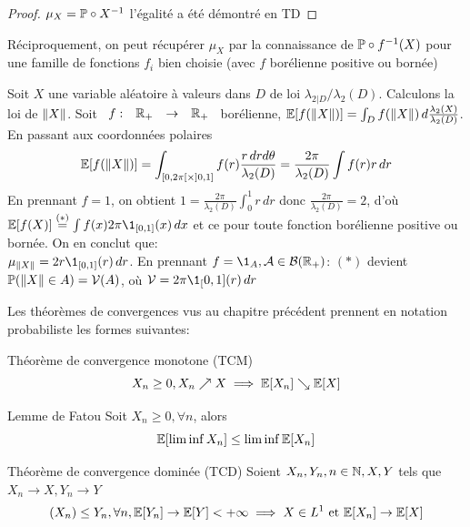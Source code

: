 \documentclass[]{report}
\begin{document}
    \begin{proof}
        $\mu_X=\mathbb{P}\circ X^{-1}$ l'égalité a été démontré en TD
    \end{proof}

    \begin{re}{}{}
        Réciproquement, on peut récupérer $\mu_X$ par la connaissance de $\mathbb{P}\circ f^{-1}(X)$ pour une famille de fonctions $f_i$ bien choisie (avec $f$ borélienne positive ou bornée)
    \end{re}

    \begin{ex}{}{}
        Soit $X$ une variable aléatoire à valeurs dans $D$ de loi $\lambda_{2|D}/\lambda_2(D)$. Calculons la loi de $\lVert X \rVert$. Soit $\begin{array}{ccccc} f : & \mathbb{R}_+ & \to & \mathbb{R}_+ \end{array}$ borélienne, $\mathbb{E}[f(\lVert X \rVert)]=\int_{D}f(\lVert X \rVert)\,d\frac{\lambda_2(X)}{\lambda_2(D)}$. En passant aux coordonnées polaires\\
        \[\mathbb{E}[f(\lVert X \rVert)]=\int_{[0,2\pi[\times ]0,1]}f(r)\frac{r\,drd\theta}{\lambda_2(D)}=\frac{2\pi}{\lambda_2(D)}\int f(r)r\,dr\]
        En prennant $f=1$, on obtient $1=\frac{2\pi}{\lambda_2(D)}\int_{0}^{1} r\,dr$ donc $\frac{2\pi}{\lambda_2(D)}=2$, d'où $\Ea[f(X)]\overset{(*)}{=}\int f(x)2\pi \1_{[0,1]}(x)\,dx$ et ce pour toute fonction borélienne positive ou bornée. On en conclut que:\\
        $\mu_{\norme{X}}=2r\1_{[0,1]}(r)\,dr$. En prennant $f=\1_A,\Ar\in\Br(\R_+)$: $(*)$ devient $\mathbb{P}(\lVert X \rVert\in A)=\mathcal{V}(A)$, où $\Vr=2\pi\1_[0,1](r)\,dr$
    \end{ex}

    Les théorèmes de convergences vus au chapitre précédent prennent en notation probabiliste les formes suivantes:

    \begin{tm}{Théorème de convergence monotone (TCM)}{}
        \[X_n\ge 0,X_n\nearrow X\implies \mathbb{E}[X_n]\searrow \mathbb{E}[X]\]
    \end{tm}

    \begin{lm}{Lemme de Fatou}{}
        Soit $X_n\ge 0,\forall n$, alors
        \[\mathbb{E}[\liminf X_n]\le \liminf \mathbb{E}[X_n]\]
    \end{lm}

    \begin{tm}{Théorème de convergence dominée (TCD)}{}
        Soient $X_n,Y_n,n\in \mathbb{N},X,Y$ tels que $X_n\to X, Y_n\to Y$
        \[(X_n)\le Y_n,\forall n, \mathbb{E}[Y_n]\to\mathbb{E}[Y]<+\infty\implies X\in L^1\text{ et }\mathbb{E}[X_n]\to \mathbb{E} [X]\]
    \end{tm}
\end{document}
